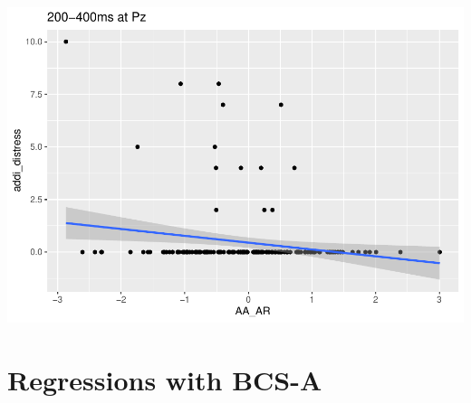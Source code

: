 \documentclass[
]{article}
\begin{document}
\includegraphics{do01_BUDS_files/figure-latex/unnamed-chunk-28-4.pdf}

\hypertarget{regressions-with-bcs-a}{%
\section{Regressions with BCS-A}\label{regressions-with-bcs-a}}
\end{document}
